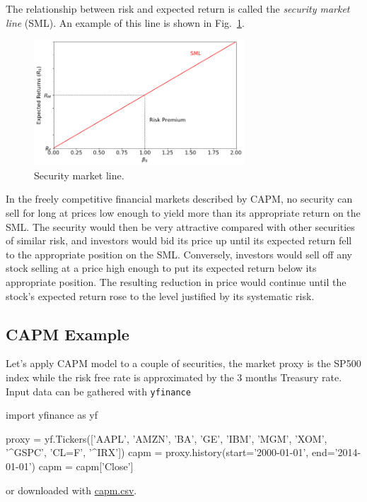 The relationship between risk and expected return is called the \emph{security market line} (SML). An example of this line is shown in Fig.~\ref{fig:sml}. %

\begin{figure}[htb]
	\centering
	\includegraphics[width=0.7\textwidth]{figures/sml}
	\caption{Security market line.}
	\label{fig:sml}
\end{figure}

In the freely competitive financial markets described by CAPM, no security can sell for long at prices low enough to yield more than its appropriate return on the SML. The security would then be very attractive compared with other securities of similar risk, and investors would bid its price up until its expected return fell to the appropriate position on the SML. Conversely, investors would sell off any stock selling at a price high enough to put its expected return below its appropriate position. The resulting reduction in price would continue until the stock’s expected return rose to the level justified by its systematic risk.

\subsection{CAPM Example}

Let's apply CAPM model to a couple of securities, the market proxy is the SP500 index while the risk free rate is approximated by the 3 months Treasury rate.
Input data can be gathered with \texttt{yfinance}

\begin{ipython}
import yfinance as yf

proxy = yf.Tickers(['AAPL', 'AMZN', 'BA', 'GE', 'IBM', 'MGM', 
                    'XOM', '^GSPC', 'CL=F', '^IRX'])
capm = proxy.history(start='2000-01-01', end='2014-01-01')
capm = capm['Close']
\end{ipython}
\noindent
or downloaded with \href{https://raw.githubusercontent.com/matteosan1/finance_course/develop/libro/input_files/capm.csv}{capm.csv}.

